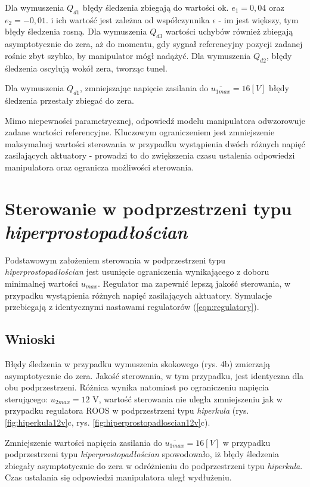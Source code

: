 \documentclass[12pt, a4paper, polish]{article}
\begin{document}
	Dla wymuszenia $Q_{d1}$ błędy śledzenia zbiegają do wartości ok. $e_1=0,04$ oraz $e_2=-0,01$. i ich wartość jest zależna od współczynnika $\epsilon$ - im jest większy, tym błędy śledzenia rosną. Dla wymuszenia $Q_{d3}$ wartości uchybów również zbiegają asymptotycznie do zera, aż do momentu, gdy sygnał referencyjny pozycji zadanej rośnie zbyt szybko, by manipulator mógł nadążyć. Dla wymuszenia $Q_{d2}$, błędy śledzenia oscylują wokół zera, tworząc tunel.
	
	Dla wymuszenia $Q_{d1}$, zmniejszając napięcie zasilania do $\overline{u_{1max}}=16[V]$ błędy śledzenia przestały zbiegać do zera.
	
	Mimo niepewności parametrycznej, odpowiedź modelu manipulatora odwzorowuje zadane wartości referencyjne. Kluczowym ograniczeniem jest zmniejszenie maksymalnej wartości sterowania w przypadku wystąpienia dwóch różnych napięć zasilających aktuatory - prowadzi to do zwiększenia czasu ustalenia odpowiedzi manipulatora oraz ogranicza możliwości sterowania.
	
	\section{Sterowanie w podprzestrzeni typu \textit{hiperprostopadłościan}}
	Podstawowym założeniem sterowania w podprzestrzeni typu \textit{hiperprostopadłościan} jest usunięcie ograniczenia wynikającego z doboru minimalnej wartości $u_{max}$. Regulator ma zapewnić lepszą jakość sterowania, w przypadku wystąpienia różnych napięć zasilających aktuatory. Symulacje przebiegają z identycznymi nastawami regulatorów (\ref{eqn:regulatory}). 
	
	\subsection{Wnioski}
	Błędy śledzenia w przypadku wymuszenia skokowego (rys. 4b) zmierzają asymptotycznie do zera. Jakość sterowania, w tym przypadku, jest identyczna dla obu podprzestrzeni. Różnica wynika natomiast po ograniczeniu napięcia sterującego: $u_{2max}=12$ V, wartość sterowania nie uległa zmniejszeniu jak w przypadku regulatora ROOS w podprzestrzeni typu \textit{hiperkula} (rys. \ref{fig:hiperkula12v}c, rys. \ref{fig:hiperprostopadloscian12v}c). 
	
	Zmniejszenie wartości napięcia zasilania do $\overline{u_{1max}}=16[V]$ w przypadku podprzestrzeni typu \textit{hiperprostopadłościan} spowodowało, iż błędy śledzenia zbiegały asymptotycznie do zera w odróżnieniu do podprzestrzeni typu \textit{hiperkula}. Czas ustalania się odpowiedzi manipulatora uległ wydłużeniu.
	
\end{document}
